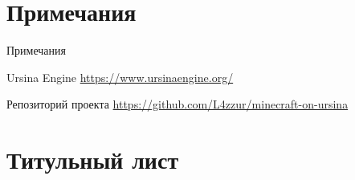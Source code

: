 \documentclass[handout]{beamer}
\begin{document}
            
    
    \section{Примечания}
    \begin{frame}{Примечания}
        \footnotesize{
            \begin{thebibliography}{99}
            
             Ursina Engine
            \newblock \href{https://www.ursinaengine.org/}{https://www.ursinaengine.org/}
            
             Репозиторий проекта
            \newblock \href{https://github.com/L4zzur/minecraft-on-ursina}{https://github.com/L4zzur/minecraft-on-ursina}
            
            \end{thebibliography}
        }
    \end{frame}

    \section{Титульный лист}
	\begin{frame}
		\titlepage
	\end{frame}
\end{document}
